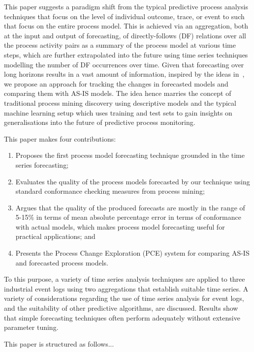 This paper suggests a paradigm shift from the typical predictive process analysis techniques that focus on the level of individual outcome, trace, or event to such that focus on the entire process model.
This is achieved via an aggregation, both at the input and output of forecasting, of directly-follows (DF) relations over all the process activity pairs as a summary of the process model at various time steps, which are further extrapolated into the future using time series techniques modelling the number of DF occurrences over time.
Given that forecasting over long horizons results in a vast amount of information, inspired by the ideas in~\cite{DBLP:conf/er/KabicherKR11}, we propose an approach for tracking the changes in forecasted models and comparing them with AS-IS models.
The idea hence marries the concept of traditional process mining discovery using descriptive models and the typical machine learning setup which uses training and test sets to gain insights on generalisations into the future of predictive process monitoring.

This paper makes four contributions:
\begin{enumerate}
	\item Proposes the first process model forecasting technique grounded in the time series forecasting;
	\item Evaluates the quality of the process models forecasted by our technique using standard conformance checking measures from process mining;
	\item Argues that the quality of the produced forecasts are mostly in the range of 5-15\% in terms of mean absolute percentage error in terms of conformance with actual models, which makes process model forecasting useful for practical applications; and
	\item Presents the Process Change Exploration (PCE) system for comparing AS-IS and forecasted process models.
\end{enumerate}

To this purpose, a variety of time series analysis techniques are applied to three industrial event logs using two aggregations that establish suitable time series. 
A variety of considerations regarding the use of time series analysis for event logs, and the suitability of other predictive algorithms, are discussed.
Results show that simple forecasting techniques often perform adequately without extensive parameter tuning. 

This paper is structured as follows...